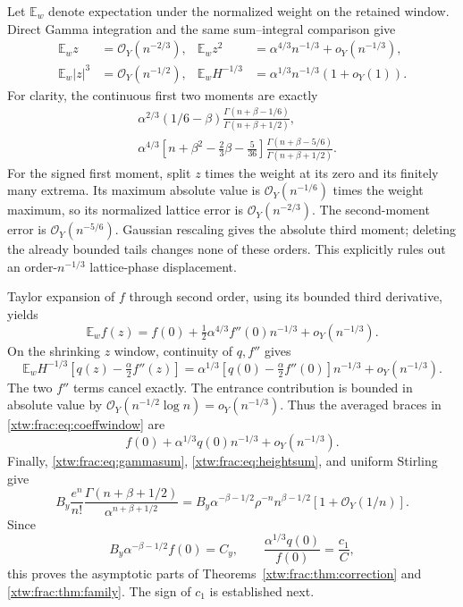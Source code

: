 \documentclass[11pt]{article}
\theoremstyle{remark}\newtheorem{remark}[theorem]{Remark}
\newcommand{\OO}{\mathcal O}
\newcommand{\E}{\mathbb E}
\begin{document}
Let $\E_w$ denote expectation under the normalized weight on the retained
window. Direct Gamma integration and the same sum--integral comparison give
\begin{align}
 \E_wz&=\OO_Y(n^{-2/3}),&
 \E_wz^2&=\alpha^{4/3}n^{-1/3}+o_Y(n^{-1/3}),\label{xtw:frac:eq:moments1}\\
 \E_w|z|^3&=\OO_Y(n^{-1/2}),&
 \E_wH^{-1/3}&=\alpha^{1/3}n^{-1/3}(1+o_Y(1)).\label{xtw:frac:eq:moments2}
\end{align}
For clarity, the continuous first two moments are exactly
\begin{align}
 &\alpha^{2/3}(1/6-\beta)
       \frac{\Gamma(n+\beta-1/6)}{\Gamma(n+\beta+1/2)},\label{xtw:frac:eq:gammafirst}\\
 &\alpha^{4/3}\left[n+\beta^2-\frac23\beta-\frac5{36}\right]
       \frac{\Gamma(n+\beta-5/6)}{\Gamma(n+\beta+1/2)}.\label{xtw:frac:eq:gammasecond}
\end{align}
For the signed first moment, split $z$ times the weight at its zero and
its finitely many extrema. Its maximum absolute value is
$\OO_Y(n^{-1/6})$ times the weight maximum, so its normalized lattice
error is $\OO_Y(n^{-2/3})$. The second-moment error is
$\OO_Y(n^{-5/6})$. Gaussian rescaling gives the absolute third moment;
deleting the already bounded tails changes none of these orders.
This explicitly rules out an order-$n^{-1/3}$ lattice-phase displacement.

Taylor expansion of $f$ through second order, using its bounded third
derivative, yields
\[
 \E_w f(z)=f(0)+\tfrac12\alpha^{4/3}f''(0)n^{-1/3}
                                      +o_Y(n^{-1/3}).
\]
On the shrinking $z$ window, continuity of $q,f''$ gives
\[
 \E_wH^{-1/3}[q(z)-\tfrac\alpha2f''(z)]
 =\alpha^{1/3}[q(0)-\tfrac\alpha2f''(0)]n^{-1/3}
                                      +o_Y(n^{-1/3}).
\]
The two $f''$ terms cancel exactly. The entrance contribution is bounded
in absolute value by $\OO_Y(n^{-1/2}\log n)=o_Y(n^{-1/3})$.
Thus the averaged braces in \eqref{xtw:frac:eq:coeffwindow} are
\begin{equation}\label{xtw:frac:eq:averaged}
 f(0)+\alpha^{1/3}q(0)n^{-1/3}+o_Y(n^{-1/3}).
\end{equation}
Finally, \eqref{xtw:frac:eq:gammasum}, \eqref{xtw:frac:eq:heightsum}, and uniform Stirling give
\[
 B_y\frac{e^n}{n!}
       \frac{\Gamma(n+\beta+1/2)}{\alpha^{n+\beta+1/2}}
 =B_y\alpha^{-\beta-1/2}\rho^{-n}n^{\beta-1/2}
                                                  [1+\OO_Y(1/n)].
\]
Since
\[
 B_y\alpha^{-\beta-1/2}f(0)=C_y,\qquad
 \frac{\alpha^{1/3}q(0)}{f(0)}=\frac{c_1}{C},
\]
this proves the asymptotic parts of Theorems~\ref{xtw:frac:thm:correction} and
\ref{xtw:frac:thm:family}. The sign of $c_1$ is established next.
\end{document}
